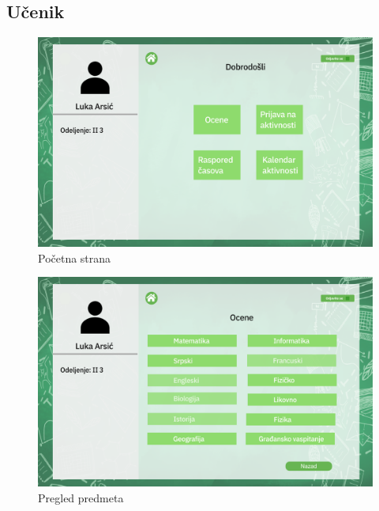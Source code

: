 \documentclass{article}
\begin{document}
\newpage
\subsection{Učenik}

\begin{figure} [!ht]
    \begin{center}
        \includegraphics[scale=0.22]{../UI/Ucenik/Student_begin_page.png}
    \end{center}
\caption{Početna strana}
\end{figure}

\begin{figure} [!ht]
    \begin{center}
        \includegraphics[scale=0.22]{../UI/Ucenik/Student_subjects.png}
    \end{center}
\caption{Pregled predmeta}
\end{figure}
\end{document}
